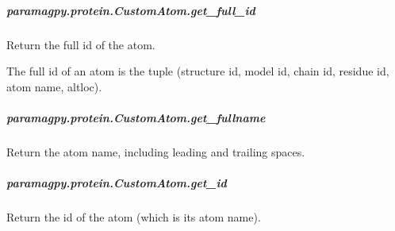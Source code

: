 \documentclass[a4paper,10pt,english,openany,oneside]{sphinxmanual}
\begin{document}
\begin{fulllineitems}
\begin{fulllineitems}
\begin{fulllineitems}
\end{fulllineitems}



\subparagraph{paramagpy.protein.CustomAtom.get\_full\_id}
\label{\detokenize{reference/generated/paramagpy.protein.CustomAtom.get_full_id:paramagpy-protein-customatom-get-full-id}}\label{\detokenize{reference/generated/paramagpy.protein.CustomAtom.get_full_id::doc}}

\begin{fulllineitems}
\label{\detokenize{reference/generated/paramagpy.protein.CustomAtom.get_full_id:paramagpy.protein.CustomAtom.get_full_id}}
Return the full id of the atom.

The full id of an atom is the tuple
(structure id, model id, chain id, residue id, atom name, altloc).

\end{fulllineitems}



\subparagraph{paramagpy.protein.CustomAtom.get\_fullname}
\label{\detokenize{reference/generated/paramagpy.protein.CustomAtom.get_fullname:paramagpy-protein-customatom-get-fullname}}\label{\detokenize{reference/generated/paramagpy.protein.CustomAtom.get_fullname::doc}}

\begin{fulllineitems}
\label{\detokenize{reference/generated/paramagpy.protein.CustomAtom.get_fullname:paramagpy.protein.CustomAtom.get_fullname}}
Return the atom name, including leading and trailing spaces.

\end{fulllineitems}



\subparagraph{paramagpy.protein.CustomAtom.get\_id}
\label{\detokenize{reference/generated/paramagpy.protein.CustomAtom.get_id:paramagpy-protein-customatom-get-id}}\label{\detokenize{reference/generated/paramagpy.protein.CustomAtom.get_id::doc}}

\begin{fulllineitems}
\label{\detokenize{reference/generated/paramagpy.protein.CustomAtom.get_id:paramagpy.protein.CustomAtom.get_id}}
Return the id of the atom (which is its atom name).


\end{fulllineitems}
\end{fulllineitems}
\end{fulllineitems}
\end{document}
